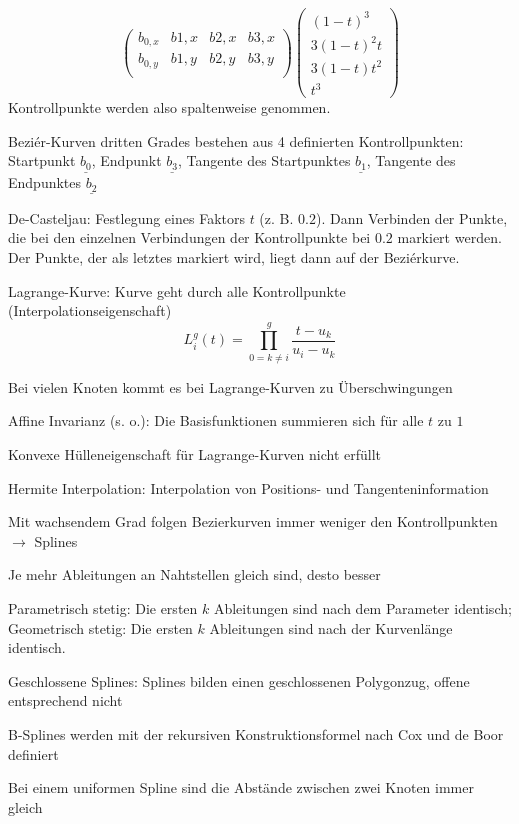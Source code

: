\documentclass[12pt,landscape]{article}
\begin{document}
\begin{multicols}{3}
\begin{compactitem}
\[\begin{pmatrix}
b_{0,x} & b{1,x} & b{2,x} & b{3,x} \\ 
b_{0,y} & b{1,y} & b{2,y} & b{3,y} \\ 
\end{pmatrix}\begin{pmatrix}
(1-t)^3 \\
3(1-t)^2t \\
3(1-t)t^2 \\
t^3
\end{pmatrix}\]
Kontrollpunkte werden also spaltenweise genommen.
\item Beziér-Kurven dritten Grades bestehen aus 4 definierten Kontrollpunkten: Startpunkt $\underline{b_0}$, Endpunkt $\underline{b_3}$, Tangente des Startpunktes $\underline{b_1}$, Tangente des Endpunktes $\underline{b_2}$
\item De-Casteljau: Festlegung eines Faktors $t$ (z. B. $0.2$). Dann Verbinden der Punkte, die bei den einzelnen Verbindungen der Kontrollpunkte bei $0.2$ markiert werden. Der Punkte, der als letztes markiert wird, liegt dann auf der Beziérkurve.
\item Lagrange-Kurve: Kurve geht durch alle Kontrollpunkte (Interpolationseigenschaft)
\[ L_i^g(t) = \prod_{0=k\neq i}^{g} \frac{t-u_k}{u_i - u_k}\]
\item Bei vielen Knoten kommt es bei Lagrange-Kurven zu Überschwingungen
\item Affine Invarianz (s. o.): Die Basisfunktionen summieren sich für alle $t$ zu $1$
\item Konvexe Hülleneigenschaft für Lagrange-Kurven nicht erfüllt
\item Hermite Interpolation: Interpolation von Positions- und Tangenteninformation
\item Mit wachsendem Grad folgen Bezierkurven immer weniger den Kontrollpunkten $\rightarrow$ Splines
\item Je mehr Ableitungen an Nahtstellen gleich sind, desto besser
\item Parametrisch stetig: Die ersten $k$ Ableitungen sind nach dem Parameter identisch; Geometrisch stetig: Die ersten $k$ Ableitungen sind nach der Kurvenlänge identisch. 
\item Geschlossene Splines: Splines bilden einen geschlossenen Polygonzug, offene entsprechend nicht
\item B-Splines werden mit der rekursiven Konstruktionsformel nach Cox und de Boor definiert
\item Bei einem uniformen Spline sind die Abstände zwischen zwei Knoten immer gleich

\end{compactitem}
\end{multicols}
\end{document}
